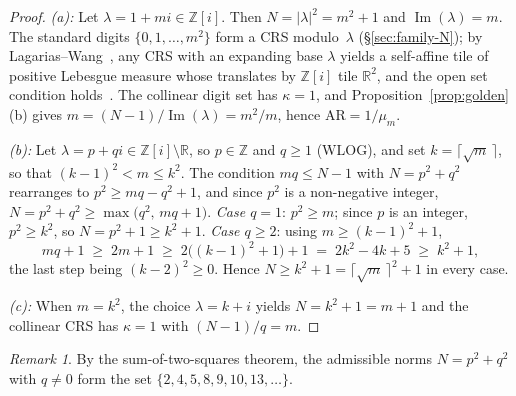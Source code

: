 \documentclass{amsart}
\theoremstyle{definition}
\theoremstyle{remark}
\newtheorem{remark}[theorem]{Remark}
\begin{document}
\begin{proof}
\textit{(a):}
Let $\lambda = 1+mi \in \mathbb{Z}[i]$.
Then $N = |\lambda|^2 = m^2+1$ and $\operatorname{Im}(\lambda)=m$.
The standard digits $\{0,1,\ldots,m^2\}$ form a CRS
modulo~$\lambda$ (\S\ref{sec:family-N}); by
Lagarias--Wang~\cite{LagariasWang1996}, any CRS with an
expanding base $\lambda$ yields a self-affine tile of positive
Lebesgue measure whose translates by $\mathbb{Z}[i]$ tile
$\mathbb{R}^2$, and the open set condition
holds~\cite{Bandt1991}.
The collinear digit set has $\kappa = 1$, and
Proposition~\ref{prop:golden}(b) gives
$m = (N\!-\!1)/\operatorname{Im}(\lambda) = m^2/m$,
hence $\mathrm{AR} = 1/\mu_m$.

\textit{(b):}
Let $\lambda=p+qi\in\mathbb{Z}[i]\setminus\mathbb{R}$,
so $p\in\mathbb{Z}$ and $q\geq 1$ \textup{(}WLOG\textup{)}, and set
$k=\lceil\sqrt{m}\,\rceil$, so that
$(k-1)^2<m\leq k^2$.
The condition $mq\leq N-1$ with $N=p^2+q^2$ rearranges to
$p^2\geq mq-q^2+1$, and since $p^2$ is a non-negative integer,
$N = p^2+q^2 \geq \max\bigl(q^2,\,mq+1\bigr)$.
\emph{Case $q=1$}: $p^2\geq m$; since $p$ is an integer,
$p^2\geq k^2$, so $N=p^2+1\geq k^2+1$.
\emph{Case $q\geq 2$}: using $m\geq (k-1)^2+1$,
\[
  mq+1 \;\geq\; 2m+1 \;\geq\; 2\bigl((k-1)^2+1\bigr)+1
        \;=\; 2k^2-4k+5 \;\geq\; k^2+1,
\]
the last step being $(k-2)^2\geq 0$.
Hence $N\geq k^2+1 = \lceil\sqrt{m}\,\rceil^2+1$ in every case.

\textit{(c):}
When $m=k^2$, the choice $\lambda=k+i$ yields $N=k^2+1=m+1$ and
the collinear CRS has $\kappa=1$ with $(N\!-\!1)/q=m$.
\end{proof}

\begin{remark}
By the sum-of-two-squares theorem, the admissible norms $N=p^2+q^2$ with
$q\neq 0$ form the set $\{2,4,5,8,9,10,13,\ldots\}$.
\end{remark}
\end{document}
